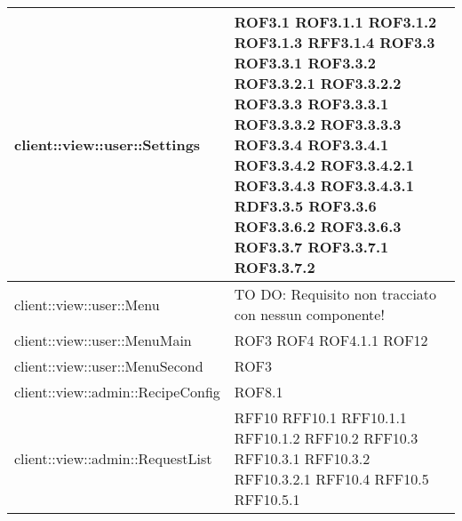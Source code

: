 \begin{center}
\begin{longtable}{| p{11cm} | p{2.5cm} |}
client::view::user::Settings & ROF3.1 \newline ROF3.1.1 \newline ROF3.1.2 \newline ROF3.1.3 \newline RFF3.1.4 \newline ROF3.3 \newline ROF3.3.1 \newline ROF3.3.2 \newline ROF3.3.2.1 \newline ROF3.3.2.2 \newline ROF3.3.3 \newline ROF3.3.3.1 \newline ROF3.3.3.2 \newline ROF3.3.3.3 \newline ROF3.3.4 \newline ROF3.3.4.1 \newline ROF3.3.4.2 \newline ROF3.3.4.2.1 \newline ROF3.3.4.3 \newline ROF3.3.4.3.1 \newline RDF3.3.5 \newline ROF3.3.6 \newline ROF3.3.6.2 \newline ROF3.3.6.3 \newline ROF3.3.7 \newline ROF3.3.7.1 \newline ROF3.3.7.2 \\
\hline
client::view::user::Menu & TO DO: Requisito non tracciato con nessun componente! \\
\hline
client::view::user::MenuMain & ROF3 \newline ROF4 \newline ROF4.1.1 \newline ROF12 \\
\hline
client::view::user::MenuSecond & ROF3 \\
\hline
client::view::admin::RecipeConfig & ROF8.1 \\
\hline
client::view::admin::RequestList & RFF10 \newline RFF10.1 \newline RFF10.1.1 \newline RFF10.1.2 \newline RFF10.2 \newline RFF10.3 \newline RFF10.3.1 \newline RFF10.3.2 \newline RFF10.3.2.1 \newline RFF10.4 \newline RFF10.5 \newline RFF10.5.1 \\

\end{longtable}
\end{center}
